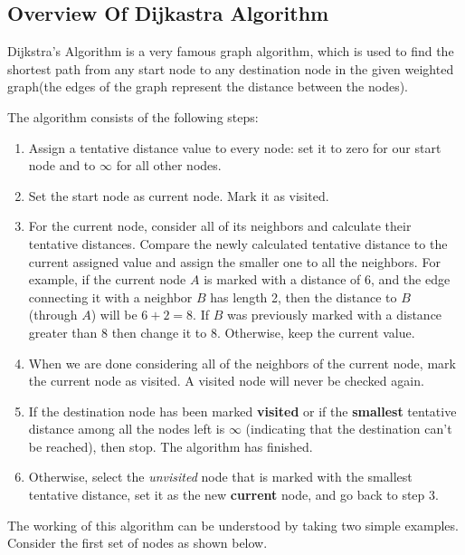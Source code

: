 \subsection{Overview Of Dijkastra Algorithm}
Dijkstra's Algorithm is a very famous graph algorithm, which is used to find the shortest path from any start node to any destination node in the given weighted graph(the edges of the graph represent the distance between the nodes).

The algorithm consists of the following steps:
\begin{enumerate}
\item Assign a tentative distance value to every node: set it to zero for our start node and to $\infty$ for all other nodes.
\item Set the start node as current node. Mark it as visited.
\item For the current node, consider all of its neighbors and calculate their tentative distances. Compare the newly calculated tentative distance to the current assigned value and assign the smaller one to all the neighbors. For example, if the current node $A$ is marked with a distance of 6, and the edge connecting it with a neighbor $B$ has length 2, then the distance to $B$ (through $A$) will be $6 + 2 = 8$. If $B$ was previously marked with a distance greater than 8 then change it to 8. Otherwise, keep the current value.
\item When we are done considering all of the neighbors of the current node, mark the current node as visited. A visited node will never be checked again.
\item If the destination node has been marked \textbf{visited} or if the \textbf{smallest} tentative distance among all the nodes left is $\infty$ (indicating that the destination can't be reached), then stop. The algorithm has finished.
\item Otherwise, select the \textit{unvisited} node that is marked with the smallest tentative distance, set it as the new \textbf{current} node, and go back to step 3.
\end{enumerate}

The working of this algorithm can be understood by taking two simple examples. Consider the first set of nodes as shown below.

\begin{figure}[H]
\end{figure}

